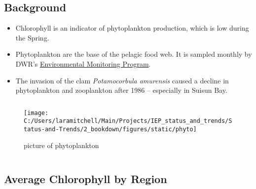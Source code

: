 \documentclass[
]{book}
\providecommand{\tightlist}{%
  \setlength{\itemsep}{0pt}\setlength{\parskip}{0pt}}
\begin{document}
\begin{columns-nocenter}

\begin{column}{0.7\textwidth}
\begin{column}

\hypertarget{background-2}{%
\subsection{Background}\label{background-2}}

\begin{itemize}
\tightlist
\item
  Chlorophyll is an indicator of phytoplankton production, which is low during the Spring.
\item
  Phytoplankton are the base of the pelagic food web. It is sampled monthly by DWR's \href{https://emp.baydeltalive.com/wiki/12297}{Environmental Monitoring Program}.
\item
  The invasion of the clam \emph{Potamocorbula amurensis} caused a decline in phytoplankton and zooplankton after 1986 -- especially in Suisun Bay.
\end{itemize}

\end{column}
\end{column}

\begin{column}{0.3\textwidth}
\begin{column}

\begin{figure}

{\centering \texttt{[image: C:/Users/laramitchell/Main/Projects/IEP\_status\_and\_trends/Status-and-Trends/2\_bookdown/figures/static/phyto]} 

}

\caption{picture of phytoplankton}\label{fig:unnamed-chunk-18}
\end{figure}

\end{column}
\end{column}

\end{columns-nocenter}

\hypertarget{average-chlorophyll-by-region}{%
\subsection{Average Chlorophyll by Region}\label{average-chlorophyll-by-region}}
\end{document}
